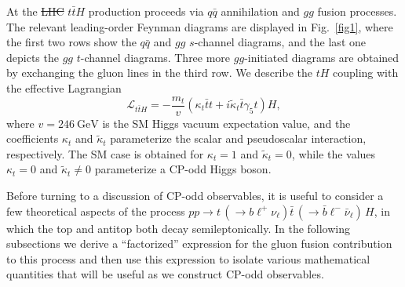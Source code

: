 \documentclass[aps,preprint,tightenlines,floatfix,superscriptaddress,nofootinbib,showpacs]{revtex4-1}
\def\beq{\begin{equation}}
\def\eeq{\end{equation}}
\def\tbar{\bar{t}}
\def\bbar{\bar{b}}
\def\nubar{{\bar{\nu}}_{\ell}}
\def\ppprocess{pp\to t\,\left(\rightarrow b {\ell}^+ \nu_{\ell}\right) \tbar\,\left(\rightarrow\bbar {\ell}^-\nubar\right)\,H}
\def\kp{\kappa_t}
\def\kpt{\tilde{\kappa}_t}
\providecommand{\DIFadd}[1]{{\protect\color{blue}\uwave{#1}}} %
\providecommand{\DIFdel}[1]{{\protect\color{red}\sout{#1}}}                      %
\providecommand{\DIFaddbegin}{} %
\providecommand{\DIFaddend}{} %
\providecommand{\DIFdelbegin}{} %
\providecommand{\DIFdelend}{} %
\begin{document}
At the \DIFdelbegin \DIFdel{LHC }\DIFdelend \DIFaddbegin \DIFadd{Large Hadron Collider (LHC) }\DIFaddend $t\bar{t}H$ production proceeds via $q\bar{q}$
annihilation and $gg$ fusion processes. The relevant leading-order Feynman
diagrams are displayed in Fig.~\ref{fig1}, where the first two
rows show the $q\bar{q}$ and $gg$ $s$-channel diagrams, and
the last one depicts the $gg$ $t$-channel diagrams.  Three more
$gg$-initiated diagrams are obtained by exchanging the gluon
lines in the third row.
We describe the $tH$ coupling with the effective Lagrangian
%
\beq
\label{eq1}
\mathcal{L}_{t\bar{t}H}=-\frac{m_t}{v}(\kp \tbar t+i\kpt \tbar
\gamma_5 t)H,
\eeq
%
where $v=246~\mathrm{GeV}$ is the SM Higgs vacuum
expectation value, and the coefficients $\kp$ and $\kpt$ parameterize 
the scalar and pseudoscalar interaction, respectively. The
SM case is obtained for $\kp=1$ and $\kpt=0$, while the values $\kp=0$
and $\kpt\neq 0$ parameterize a $\mathrm{CP}$-odd Higgs boson.

Before turning to a discussion of $\mathrm{CP}$-odd observables,
it is useful to consider a few theoretical aspects of
the process $\ppprocess$, in which the top and antitop both decay
semileptonically.
In the following subsections we derive a ``factorized''
expression for the gluon fusion contribution to this process
and then use this expression
to isolate various mathematical quantities
that will be useful as we construct $\mathrm{CP}$-odd observables.\par
\end{document}
